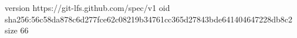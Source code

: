 version https://git-lfs.github.com/spec/v1
oid sha256:56c58da878c6d277fce62c08219b34761cc365d27843bde641404647228db8c2
size 66

